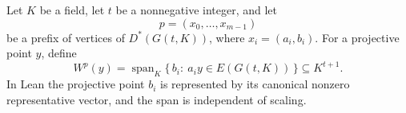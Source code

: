 \begin{definition}
Let \(K\) be a field, let \(t\) be a nonnegative integer, and let
\[
  p=(x_0,\ldots,x_{m-1})
\]
be a prefix of vertices of \(D^*(G(t,K))\), where
\(x_i=(a_i,b_i)\).  For a projective point \(y\), define
\[
  W^p(y)=
  \operatorname{span}_K\{\,b_i:\ a_i y\in E(G(t,K))\,\}
  \subseteq K^{t+1}.
\]
In Lean the projective point \(b_i\) is represented by its canonical
nonzero representative vector, and the span is independent of scaling.
\end{definition}

